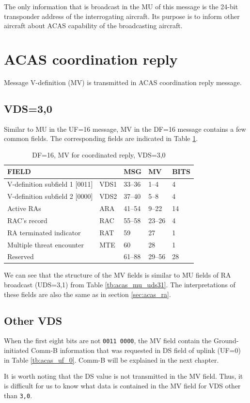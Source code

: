 The only information that is broadcast in the MU of this message is the 24-bit transponder address of the interrogating aircraft. Its purpose is to inform other aircraft about ACAS capability of the broadcasting aircraft.


\section{ACAS coordination reply}

Message V-definition (MV) is transmitted in ACAS coordination reply message. 

\subsection{VDS=3,0}
Similar to MU in the UF=16 message, MV in the DF=16 message contains a few common fields. The corresponding fields are indicated in Table \ref{tb:acas_mv_vds30}.

\begin{table}[ht]
\caption{DF=16, MV for coordinated reply, VDS=3,0}
\label{tb:acas_mv_vds30}
\begin{tabular}{|l|l|l|l|l|}
\hline
\textbf{FIELD} & \textbf{} & \textbf{MSG} & \textbf{MV} & \textbf{BITS} \\ \hline
V-definition subfield 1 [0011] & VDS1 & 33--36 & 1--4 & 4 \\ \hline
V-definition subfield 2 [0000] & VDS2 & 37--40 & 5--8 & 4 \\ \hline
Active RAs & ARA & 41--54 & 9--22 & 14 \\ \hline
RAC's record & RAC & 55--58 & 23--26 & 4 \\ \hline
RA terminated indicator & RAT & 59 & 27 & 1 \\ \hline
Multiple threat encounter & MTE & 60 & 28 & 1 \\ \hline
Reserved &  & 61--88 & 29--56 & 28 \\ \hline
\end{tabular}
\end{table}

We can see that the structure of the MV fields is similar to MU fields of RA broadcast (UDS=3,1) from Table \ref{tb:acas_mu_uds31}. The interpretations of these fields are also the same as in section \ref{sec:acas_ra}.

\subsection{Other VDS}
When the first eight bits are not \texttt{0011 0000}, the MV field contain the Ground-initiated Comm-B information that was requested in DS field of uplink (UF=0) in Table \ref{tb:acas_uf_0}. Comm-B will be explained in the next chapter.

It is worth noting that the DS value is not transmitted in the MV field. Thus, it is difficult for us to know what data is contained in the MV field for VDS other than \texttt{3,0}.
